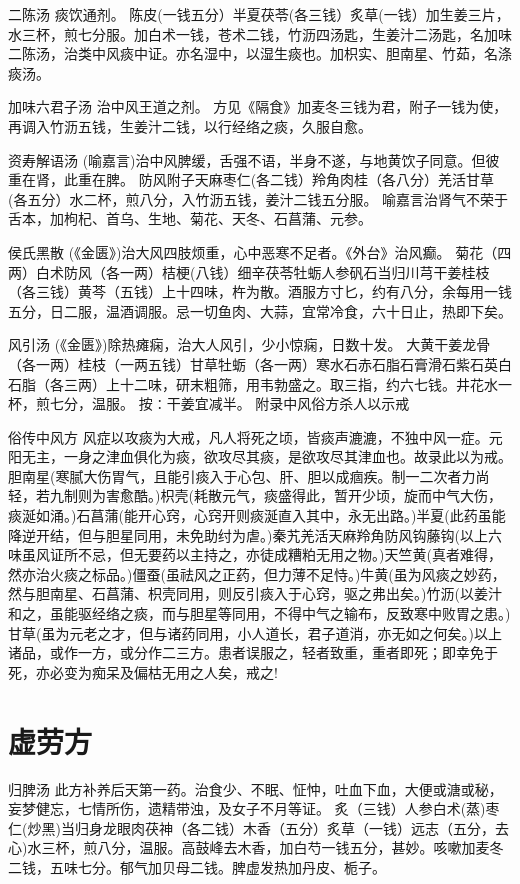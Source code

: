 \documentclass[a4paper,12pt,UTF8,twoside]{ctexbook}
\begin{document}
    二陈汤
    痰饮通剂。
    陈皮(一钱五分）半夏茯苓(各三钱）炙草(一钱）加生姜三片，水三杯，煎七分服。加白术一钱，苍术二钱，竹沥四汤匙，生姜汁二汤匙，名加味二陈汤，治类中风痰中证。亦名湿中，以湿生痰也。加枳实、胆南星、竹茹，名涤痰汤。
    
    加味六君子汤
    治中风王道之剂。
    方见《隔食》加麦冬三钱为君，附子一钱为使，再调入竹沥五钱，生姜汁二钱，以行经络之痰，久服自愈。
    
    资寿解语汤
    (喻嘉言)治中风脾缓，舌强不语，半身不遂，与地黄饮子同意。但彼重在肾，此重在脾。
    防风附子天麻枣仁(各二钱）羚角肉桂（各八分）羌活甘草(各五分）水二杯，煎八分，入竹沥五钱，姜汁二钱五分服。
    喻嘉言治肾气不荣于舌本，加枸杞、首乌、生地、菊花、天冬、石菖蒲、元参。
    
    侯氏黑散
    (《金匮》)治大风四肢烦重，心中恶寒不足者。《外台》治风癫。
    菊花（四两）白术防风（各一两）桔梗(八钱）细辛茯苓牡蛎人参矾石当归川芎干姜桂枝（各三钱）黄芩（五钱）上十四味，杵为散。酒服方寸匕，约有八分，余每用一钱五分，日二服，温酒调服。忌一切鱼肉、大蒜，宜常冷食，六十日止，热即下矣。
    
    风引汤
    (《金匮》)除热瘫痫，治大人风引，少小惊痫，日数十发。
    大黄干姜龙骨（各一两）桂枝（一两五钱）甘草牡蛎（各一两）寒水石赤石脂石膏滑石紫石英白石脂（各三两）上十二味，研末粗筛，用韦勃盛之。取三指，约六七钱。井花水一杯，煎七分，温服。
    按∶干姜宜减半。
     附录中风俗方杀人以示戒	
    
    俗传中风方
    风症以攻痰为大戒，凡人将死之顷，皆痰声漉漉，不独中风一症。元阳无主，一身之津血俱化为痰，欲攻尽其痰，是欲攻尽其津血也。故录此以为戒。
    胆南星(寒腻大伤胃气，且能引痰入于心包、肝、胆以成痼疾。制一二次者力尚轻，若九制则为害愈酷。)枳壳(耗散元气，痰盛得此，暂开少顷，旋而中气大伤，痰涎如涌。)石菖蒲(能开心窍，心窍开则痰涎直入其中，永无出路。)半夏(此药虽能降逆开结，但与胆星同用，未免助纣为虐。)秦艽羌活天麻羚角防风钩藤钩(以上六味虽风证所不忌，但无要药以主持之，亦徒成糟粕无用之物。)天竺黄(真者难得，然亦治火痰之标品。)僵蚕(虽祛风之正药，但力薄不足恃。)牛黄(虽为风痰之妙药，然与胆南星、石菖蒲、枳壳同用，则反引痰入于心窍，驱之弗出矣。)竹沥(以姜汁和之，虽能驱经络之痰，而与胆星等同用，不得中气之输布，反致寒中败胃之患。)甘草(虽为元老之才，但与诸药同用，小人道长，君子道消，亦无如之何矣。)以上诸品，或作一方，或分作二三方。患者误服之，轻者致重，重者即死；即幸免于死，亦必变为痴呆及偏枯无用之人矣，戒之! 
    
    \chapter{虚劳方}
    归脾汤
    此方补养后天第一药。治食少、不眠、怔忡，吐血下血，大便或溏或秘，妄梦健忘，七情所伤，遗精带浊，及女子不月等证。
    炙（三钱）人参白术(蒸)枣仁(炒黑)当归身龙眼肉茯神（各二钱）木香（五分）炙草（一钱）远志（五分，去心)水三杯，煎八分，温服。高鼓峰去木香，加白芍一钱五分，甚妙。咳嗽加麦冬二钱，五味七分。郁气加贝母二钱。脾虚发热加丹皮、栀子。
    
\end{document}
